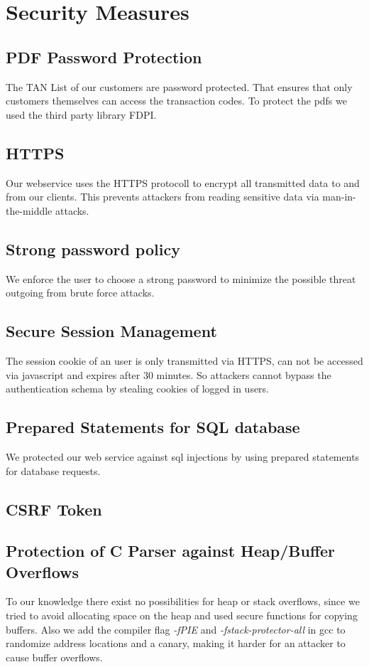 \chapter{Security Measures}

\section{PDF Password Protection}
The TAN List of our customers are password protected. That ensures that only customers themselves can access the transaction codes. To protect the pdfs we used the third party library FDPI.
\section{HTTPS}
Our webservice uses the HTTPS protocoll to encrypt all transmitted data to and from our clients.
This prevents attackers from reading sensitive data via man-in-the-middle attacks.
\section{Strong password policy}
We enforce the user to choose a strong password to minimize the possible threat outgoing from brute force attacks.
\section{Secure Session Management}
The session cookie of an user is only transmitted via HTTPS, can not be accessed via javascript and expires after 30 minutes. So attackers cannot bypass the authentication schema by stealing cookies of logged in users.
\section{Prepared Statements for SQL database}
We protected our web service against sql injections by using prepared statements for database requests.
\section{CSRF Token}
\section{Protection of C Parser against Heap/Buffer Overflows}
To our knowledge there exist no possibilities for heap or stack overflows, since we tried to avoid allocating space on the heap and used secure functions for copying buffers. Also we add the compiler flag \textit{-fPIE} and \textit{-fstack-protector-all} in gcc to randomize address locations and a canary, making it harder for an attacker to cause buffer overflows.
